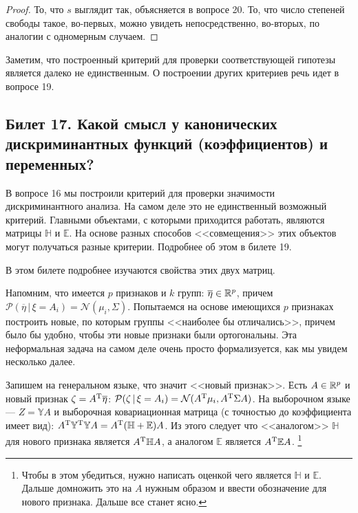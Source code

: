 \begin{proof}
   То, что $s$ выглядит так, объясняется в вопросе 20.
   То, что число степеней свободы такое, во-первых, можно увидеть непосредственно, во-вторых, по аналогии с одномерным случаем.
\end{proof}

Заметим, что построенный критерий для проверки соответствующей гипотезы является далеко не единственным.
О построении других критериев речь идет в вопросе 19.


\subsection{Билет 17. Какой смысл у канонических дискриминантных функций (коэффициентов) и переменных?}

В вопросе 16 мы построили критерий для проверки значимости дискриминантного анализа.
На самом деле это не единственный возможный критерий.
Главными объектами, с которыми приходится работать, являются матрицы $\mathbb H$ и $\mathbb E$.
На основе разных способов <<совмещения>> этих объектов могут получаться разные критерии.
Подробнее об этом в билете 19.

В этом билете подробнее изучаются свойства этих двух матриц.

\bigskip

Напомним, что имеется $p$ признаков и $k$ групп: $\overline \eta \in \mathbb{R}^p$, причем $\mathcal P(\overline \eta \, | \, \xi = A_i) =
\mathcal N(\mu_i, \Sigma)$.
Попытаемся на основе имеющихся $p$ признаках построить новые, по которым группы <<наиболее бы отличались>>, причем
было бы удобно, чтобы эти новые признаки были ортогональны.
Эта неформальная задача на самом деле очень просто формализуется, как мы увидем несколько далее.

Запишем на генеральном языке, что значит <<новый признак>>. Есть $A \in \mathbb{R}^p$ и новый признак
$\zeta = A^{\mathrm{T}} \overline \eta$: $\mathcal P(\zeta \, | \, \xi = A_i) = \mathcal N(A^{\mathrm{T}} \mu_i, A^{\mathrm{T}} \Sigma A)$.
На выборочном языке --- $Z = \mathbb Y A$ и выборочная ковариационная матрица (с точностью до коэффициента имеет вид):
$A^{\mathrm{T}} \mathbb Y^{\mathrm{T}} \mathbb Y A = A^{\mathrm{T}} ( \mathbb H + \mathbb E ) A$. Из этого следует%
что <<аналогом>> $\mathbb H$ для
нового признака является $A^{\mathrm{T}} \mathbb H A$, а аналогом $\mathbb E$ является $A^{\mathrm{T}} \mathbb E A$.
\footnote{Чтобы в этом убедиться, нужно написать оценкой чего является $\mathbb H$ и $\mathbb E$. Дальше домножить это на $A$ нужным образом
и ввести обозначение для нового признака. Дальше все станет ясно.}

